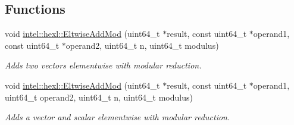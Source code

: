 \subsection*{Functions}
\begin{DoxyCompactItemize}
\item 
void \hyperlink{namespaceintel_1_1hexl_a319244a133f57825ba7e593ad5c71709}{intel\+::hexl\+::\+Eltwise\+Add\+Mod} (uint64\+\_\+t $\ast$result, const uint64\+\_\+t $\ast$operand1, const uint64\+\_\+t $\ast$operand2, uint64\+\_\+t n, uint64\+\_\+t modulus)
\begin{DoxyCompactList}\small\item\em Adds two vectors elementwise with modular reduction. \end{DoxyCompactList}\item 
void \hyperlink{namespaceintel_1_1hexl_a8e0884463658eae11b6f1c6dfeb50b40}{intel\+::hexl\+::\+Eltwise\+Add\+Mod} (uint64\+\_\+t $\ast$result, const uint64\+\_\+t $\ast$operand1, uint64\+\_\+t operand2, uint64\+\_\+t n, uint64\+\_\+t modulus)
\begin{DoxyCompactList}\small\item\em Adds a vector and scalar elementwise with modular reduction. \end{DoxyCompactList}\end{DoxyCompactItemize}
